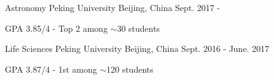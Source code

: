 


\begin{cventries}


\cventry
{Astronomy} %
{Peking University} %
{Beijing, China} %
{Sept. 2017 - } %
{ %
	\begin{cvitems}
		\item {GPA 3.85/4 - Top 2 among $\sim$30 students}
	\end{cvitems}
}

\cventry
{Life Sciences} %
{Peking University} %
{Beijing, China} %
{Sept. 2016 - June. 2017} %
{ %
	\begin{cvitems}
		\item {GPA 3.87/4 - 1st among $\sim$120 students}
	\end{cvitems}
}


\end{cventries}